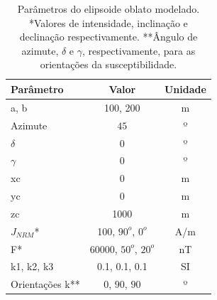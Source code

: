 \begin{table}[h!]
	\begin{center}
		\begin{tabular}{|l|c|c|}
			\hline
			\textbf{Parâmetro}  & \textbf{Valor} & \textbf{Unidade} \\
			\hline 
			a, b  & 100, 200 & m \\
			\hline
			Azimute   & $45$ & º\\
			\hline
			$\delta$    & $0$ & º\\
			\hline
			$\gamma$   & $0$  & º\\
			\hline
			xc   & 0  & m\\
			\hline          
			yc   & 0  & m\\
			\hline                
			zc   & 1000  & m\\
			\hline
			$J_{NRM}$*  & 100, $90^o$, $0^o$  & A/m\\
			\hline
			F*    & 60000, $50^o$, $20^o$ & nT\\
			\hline
			k1, k2, k3   & 0.1, 0.1, 0.1  & SI\\
			\hline
			Orientações k**   & $0$, $90$, $90$  & º\\
			\hline
		\end{tabular}
		\caption{Parâmetros do elipsoide oblato modelado. *Valores de intensidade, inclinação e declinação respectivamente. **Ângulo de azimute, $\delta$ e $\gamma$, respectivamente, para as orientações da susceptibilidade.}
	\end{center}
	\label{tab:oblate}
\end{table}

